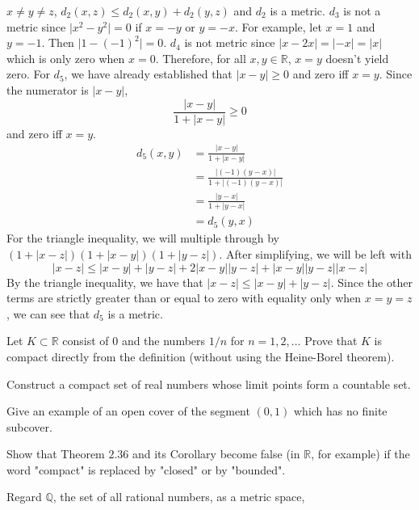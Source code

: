 \begin{exercise}
  \(x\neq y\neq z\), \(d_2(x,z)\leq d_2(x,y) + d_2(y,z)\) and \(d_2\) is a
  metric.
  \(d_3\) is not a metric since \(\lvert x^2 - y^2\rvert = 0\) if \(x = -y\) or
  \(y = -x\).
  For example, let \(x = 1\) and \(y = -1\).
  Then \(\lvert 1 - (-1)^2\rvert = 0\).
  \(d_4\) is not metric since \(\lvert x - 2x\rvert = \lvert -x\rvert =
  \lvert x\rvert\) which is only zero when \(x = 0\).
  Therefore, for all \(x,y\in\mathbb{R}\), \(x = y\) doesn't yield zero.
  For \(d_5\), we have already established that \(\lvert x - y\rvert\geq 0\)
  and zero iff \(x = y\).
  Since the numerator is \(\lvert x - y\lvert\),
  \[
  \frac{\lvert x - y\rvert}{1 + \lvert x - y\rvert}\geq 0
  \]
  and zero iff \(x = y\).
  \begin{align*}
    d_5(x, y) & = \frac{\lvert x - y\rvert}{1 + \lvert x - y\rvert}\\
              & = \frac{\lvert (-1)(y - x)\rvert}
                {1 + \lvert (-1)(y - x)\rvert}\\
              & = \frac{\lvert y - x\rvert}{1 + \lvert y - x\rvert}\\
              & = d_5(y, x)
  \end{align*}
  For the triangle inequality, we will multiple through by
  \((1 + \lvert x - z\rvert)(1 + \lvert x - y\rvert)(1 + \lvert y - z\rvert)\).
  After simplifying, we will be left with
  \[
  \lvert x - z\rvert\leq\lvert x - y\rvert + \lvert y - z\rvert +
  2\lvert x - y\rvert\lvert y - z\rvert + \lvert x - y\rvert\lvert y - z\rvert
  \lvert x - z\rvert
  \]
  By the triangle inequality, we have that
  \(\lvert x - z\rvert\leq\lvert x - y\rvert + \lvert y - z\rvert\).
  Since the other terms are strictly greater than or equal to zero with
  equality only when \(x = y = z\), we can see that \(d_5\) is a metric.
\item
  Let \(K\subset\mathbb{R}\) consist of \(0\) and the numbers \(1/n\) for
  \(n = 1,2,\ldots\)
  Prove that \(K\) is compact directly from the definition (without using the
  Heine-Borel theorem).
\item
  Construct a compact set of real numbers whose limit points form a countable
  set.
\item
  Give an example of an open cover of the segment \((0, 1)\) which has no
  finite subcover.
\item
  Show that Theorem \(2.36\) and its Corollary become false (in \(\mathbb{R}\),
  for example) if the word "compact" is replaced by "closed" or by "bounded".
\item
  Regard \(\mathbb{Q}\), the set of all rational numbers, as a metric space,

\end{exercise}
